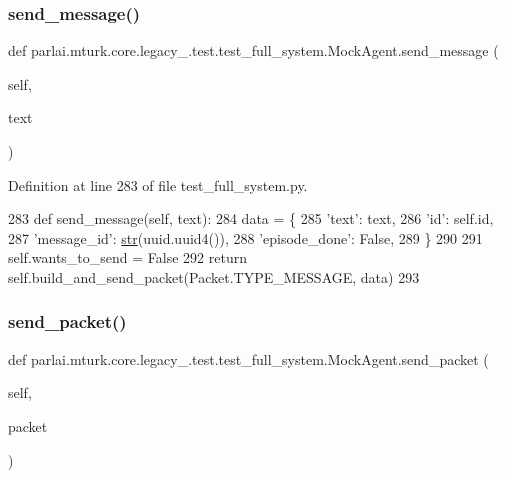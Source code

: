 \subsubsection{\texorpdfstring{send\+\_\+message()}{send\_message()}}
{\footnotesize\ttfamily def parlai.\+mturk.\+core.\+legacy\+\_.\+test.\+test\+\_\+full\+\_\+system.\+Mock\+Agent.\+send\+\_\+message (\begin{DoxyParamCaption}\item[{}]{self,  }\item[{}]{text }\end{DoxyParamCaption})}



Definition at line 283 of file test\+\_\+full\+\_\+system.\+py.


\begin{DoxyCode}
283     \textcolor{keyword}{def }send\_message(self, text):
284         data = \{
285             \textcolor{stringliteral}{'text'}: text,
286             \textcolor{stringliteral}{'id'}: self.id,
287             \textcolor{stringliteral}{'message\_id'}: \hyperlink{namespacegenerate__task__READMEs_a5b88452ffb87b78c8c85ececebafc09f}{str}(uuid.uuid4()),
288             \textcolor{stringliteral}{'episode\_done'}: \textcolor{keyword}{False},
289         \}
290 
291         self.wants\_to\_send = \textcolor{keyword}{False}
292         \textcolor{keywordflow}{return} self.build\_and\_send\_packet(Packet.TYPE\_MESSAGE, data)
293 
\end{DoxyCode}
\mbox{\label{classparlai_1_1mturk_1_1core_1_1legacy__2018_1_1test_1_1test__full__system_1_1MockAgent_a0774b6b93a6ceec37e5d1d910c222f84}} 
\subsubsection{\texorpdfstring{send\+\_\+packet()}{send\_packet()}}
{\footnotesize\ttfamily def parlai.\+mturk.\+core.\+legacy\+\_.\+test.\+test\+\_\+full\+\_\+system.\+Mock\+Agent.\+send\+\_\+packet (\begin{DoxyParamCaption}\item[{}]{self,  }\item[{}]{packet }\end{DoxyParamCaption})}



